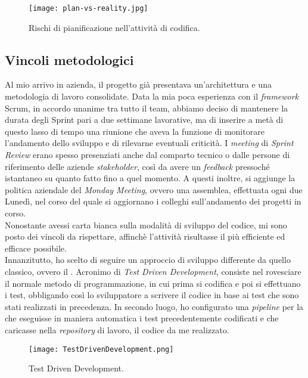 \begin{figure}[h]
\texttt{[image: plan-vs-reality.jpg]}
\centering
\caption{Rischi di pianificazione nell'attività di codifica.} 
\label{fig:plan-vs-reality}
\end{figure}

\subsection{Vincoli metodologici}
\label{subsec:vincoli-metodologici}
Al mio arrivo in azienda, il progetto già presentava un'architettura e una metodologia di lavoro consolidate.
Data la mia poca esperienza con il \textit{\gls{framework}} Scrum, in accordo unanime tra tutto il team, abbiamo deciso di mantenere la durata degli Sprint pari a due settimane lavorative, ma di inserire a metà di questo lasso di tempo una riunione che aveva la funzione di monitorare l'andamento dello sviluppo e di rilevarne eventuali criticità. I \textit{meeting} di \textit{Sprint Review} erano spesso presenziati anche dal comparto tecnico o dalle persone di riferimento delle aziende \textit{stakeholder}, così da avere un \textit{\gls{feedback}} pressoché istantaneo su quanto fatto fino a quel momento.
A questi inoltre, si aggiunge la politica aziendale del \textit{Monday Meeting}, ovvero una assemblea, effettuata ogni due Lunedì, nel corso del quale si aggiornano i colleghi sull'andamento dei progetti in corso.\\
Nonostante avessi carta bianca sulla modalità di sviluppo del codice, mi sono posto dei vincoli da rispettare, affinchè l'attività risultasse il più efficiente ed efficace possibile.\\
Innanzitutto, ho scelto di seguire un approccio di sviluppo differente da quello classico, ovvero il . Acronimo di \textit{Test Driven Development}, consiste nel rovesciare il normale metodo di programmazione, in cui prima si codifica e poi si effettuano i test, obbligando così lo sviluppatore a scrivere il codice in base ai test che sono stati realizzati in precedenza.
In secondo luogo, ho configurato una \textit{pipeline} per la  che eseguisse in maniera automatica i test precedentemente codificati e che caricasse nella \textit{repository} di lavoro, il codice da me realizzato.
\begin{figure}[h]
\texttt{[image: TestDrivenDevelopment.png]}
\centering
\caption{Test Driven Development.} 
\label{fig:tdd}
\end{figure}

